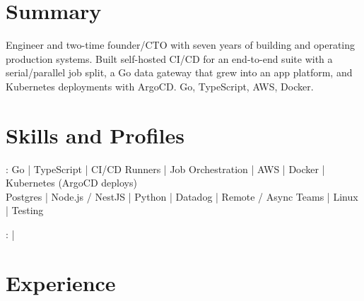 \documentclass[print]{jack-resume}
\begin{document}
\pagecolor{darkmodeBackground}


\begin{minipage}[t][1cm][t]{.03\textwidth}
    \hfill
\end{minipage}

\section{Summary}
Engineer and two-time founder/CTO with seven years of building and operating production systems. Built self-hosted CI/CD for an end-to-end suite with a serial/parallel job split, a Go data gateway that grew into an app platform, and Kubernetes deployments with ArgoCD. Go, TypeScript, AWS, Docker.
\sectionsep

\section{Skills and Profiles}
:
Go \hfill | \hfill
TypeScript \hfill | \hfill
CI/CD Runners \hfill | \hfill
Job Orchestration \hfill | \hfill
AWS \hfill | \hfill
Docker \hfill | \hfill
Kubernetes (ArgoCD deploys) \\
\hspace{1.0cm} Postgres \hfill | \hfill
Node.js / NestJS \hfill | \hfill
Python \hfill | \hfill
Datadog \hfill | \hfill
Remote / Async Teams \hfill | \hfill
Linux \hfill | \hfill
Testing \\

\raggedright{
    :
      \href{https://www.linkedin.com/in/jack-sturtevant/}{ \ExternalLink} |
     \href{https://github.com/jacksturt}{ \ExternalLink}}

\section{Experience}
\end{document}

